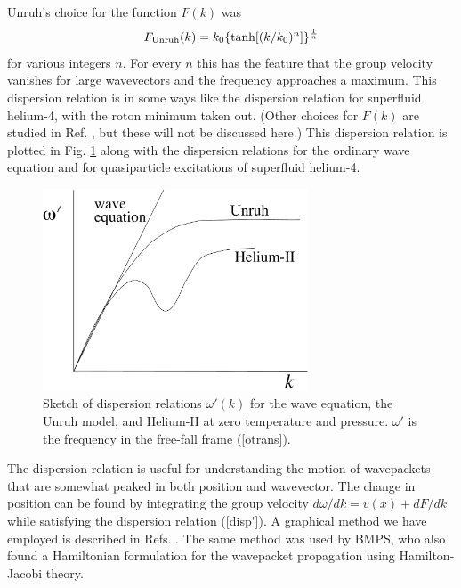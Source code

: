 \documentclass[12pt]{article}
\begin{document}
Unruh's choice\cite{Unruh2} for the function $F(k)$ was
\begin{equation}
F_{\rm Unruh}(k)=k_0\{\tanh[(k/k_0)^n]\}^{1\over n}
\label{FUN}
\end{equation}
for various integers $n$. For every $n$ this has the feature that the
group velocity vanishes for large wavevectors and the frequency
approaches a maximum.  This dispersion relation is in some ways like
the dispersion relation for superfluid helium-4, with the roton minimum
taken out.  (Other choices for $F(k)$ are studied in Ref.
\cite{CorlJaco}, but these will not be discussed here.) This dispersion
relation is plotted in Fig. \ref{disps} along with the dispersion
relations for the ordinary wave equation and for quasiparticle
excitations of superfluid helium-4.
\begin{figure}[tb]
\centerline{
\includegraphics[height=6cm]{helium-copy.pdf}
}
\caption{Sketch of dispersion relations $\omega'(k)$ for the wave equation,
the Unruh model, and Helium-II at zero temperature and pressure. 
$\omega'$ is the frequency in the free-fall frame (\ref{otrans}).}
\label{disps}
\end{figure}


The dispersion relation is useful for understanding the motion of
wavepackets that are somewhat peaked in both position and wavevector.
The change in position can be found by integrating the group velocity
$d\omega/dk=v(x)+dF/dk$ while satisfying the dispersion relation
(\ref{disp'}).  A graphical method we have employed is described in
Refs.  \cite{Jaco-mex,CorlJaco}.  The same method was used by
BMPS\cite{BMPS}, who also found a Hamiltonian formulation for the
wavepacket propagation using Hamilton-Jacobi theory.
\end{document}
